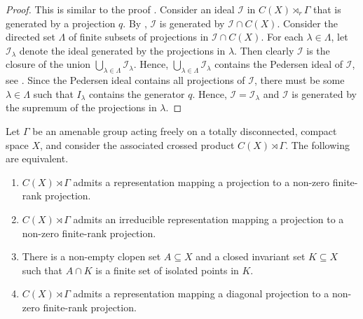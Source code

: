 \documentclass[12pt, a4paper, oneside]{amsart}
\newcommand{\0}{\mathbf{0}}
\newcommand{\1}{\mathbf{1}}
\newcommand{\I}{\mathscr{I}}
\begin{document}
	\begin{proof}
		This is similar to the proof \cite[Proposition 5.3]{kellerhals}. Consider an ideal \(\I\) in \(C(X) \rtimes_r \Gamma\) that is generated by a projection \(q\). By \cite[Theorem 1.6]{sierakowski}, \(\I\) is generated by \(\I \cap C(X)\). Consider the directed set \(\Lambda\) of finite subsets of projections in \(\I \cap C(X)\). For each \(\lambda \in \Lambda\), let \(\I_\lambda\) denote the ideal generated by the projections in \(\lambda\). Then clearly \(\I\) is the closure of the union \(\bigcup_{\lambda \in \Lambda} \I_\lambda \). Hence, \(\bigcup_{\lambda \in \Lambda} \I_\lambda \) contains the Pedersen ideal of \(\I\), see \cite[Section 5.6]{pedersen_blue}. Since the Pedersen ideal contains all projections of \(\I\), there must be some \(\lambda \in \Lambda\) such that \(I_\lambda\) contains the generator \(q\). Hence, \(\I = \I_\lambda\) and \(\I\) is generated by the supremum of the projections in \(\lambda\). 
	\end{proof}
	
	\begin{proposition}
		\label{prop_proj}
		Let \(\Gamma\) be an amenable group acting freely on a totally disconnected, compact space \(X\), and consider the associated crossed product \(C(X) \rtimes \Gamma\). The following are equivalent. 
	\begin{enumerate}
			\item \(C(X) \rtimes \Gamma\) admits a representation mapping a projection to a non-zero finite-rank projection. 
			\item \(C(X) \rtimes \Gamma\) admits an irreducible representation mapping a projection to a non-zero finite-rank projection. 
			\item There is a non-empty clopen set \(A \subseteq X\) and a closed invariant set \(K \subseteq X\) such that \(A \cap K\) is a finite set of isolated points in \(K\).
			\item \(C(X) \rtimes \Gamma\) admits a representation mapping a diagonal projection to a non-zero finite-rank projection. 
		\end{enumerate}
	\end{proposition}
	
\end{document}
